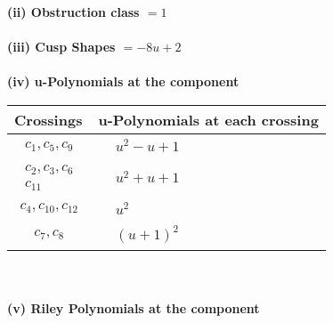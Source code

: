 \documentclass[1p]{elsarticle_modified}
\theoremstyle{definition}
\begin{document}
\flushleft \textbf{(ii) Obstruction class $= 1$}\\~\\
\flushleft \textbf{(iii) Cusp Shapes $= -8 u+2$}\\~\\
\newpage\renewcommand{\arraystretch}{1}
\flushleft \textbf{(iv) u-Polynomials at the component}\newline \\
\begin{tabular}{m{50pt}|m{274pt}}
Crossings & \hspace{64pt}u-Polynomials at each crossing \\
\hline $$\begin{aligned}c_{1},c_{5},c_{9}\end{aligned}$$&$\begin{aligned}
&u^2- u+1
\end{aligned}$\\
\hline $$\begin{aligned}c_{2},c_{3},c_{6}\\c_{11}\end{aligned}$$&$\begin{aligned}
&u^2+u+1
\end{aligned}$\\
\hline $$\begin{aligned}c_{4},c_{10},c_{12}\end{aligned}$$&$\begin{aligned}
&u^2
\end{aligned}$\\
\hline $$\begin{aligned}c_{7},c_{8}\end{aligned}$$&$\begin{aligned}
&(u+1)^2
\end{aligned}$\\
\hline
\end{tabular}\\~\\
\newpage\renewcommand{\arraystretch}{1}
\flushleft \textbf{(v) Riley Polynomials at the component}\newline \\
\end{document}
